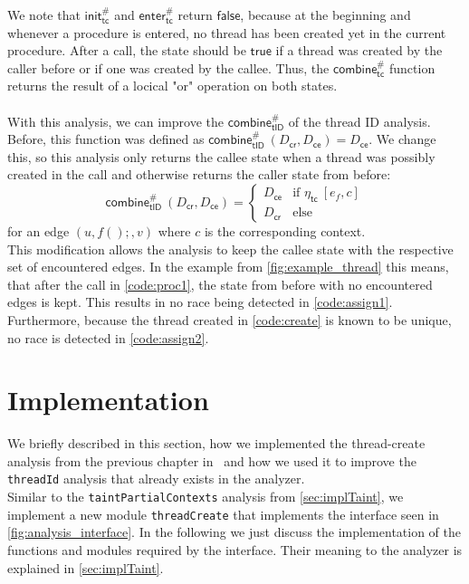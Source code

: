   We note that $\textsf{init}^{\#}_\textsf{tc}$ and $\textsf{enter}^{\#}_\textsf{tc}$ return $\textsf{false}$, because at the beginning and whenever a procedure is entered, no thread has been created yet in the current procedure. After a call, the state should be $\textsf{true}$ if a thread was created by the caller before or if one was created by the callee. Thus, the $\textsf{combine}^{\#}_\textsf{tc}$ function returns the result of a locical "or" operation on both states.\\
  \\
  With this analysis, we can improve the $\textsf{combine}^{\#}_\textsf{tID}$ of the thread ID analysis. Before, this function was defined as $\textsf{combine}^{\#}_\textsf{tID}\ (D_\textsf{cr}, D_\textsf{ce}) = D_\textsf{ce}$. We change this, so this analysis only returns the callee state when a thread was possibly created in the call and otherwise returns the caller state from before:
  \[\textsf{combine}^{\#}_\textsf{tID}\ (D_\textsf{cr}, D_\textsf{ce}) = \left\{ \begin{array}{ll}
    D_\textsf{ce} & \text{if } \eta_\textsf{tc}\ [e_f,c]\\
    D_\textsf{cr} & \text{else}
  \end{array} \right.\]
  for an edge $(u, f();, v)$ where $c$ is the corresponding context.\\
  This modification allows the analysis to keep the callee state with the respective set of encountered edges. In the example from \autoref{fig:example_thread} this means, that after the call in \autoref{code:proc1}, the state from before with no encountered edges is kept. This results in no race being detected in \autoref{code:assign1}. Furthermore, because the thread created in \autoref{code:create} is known to be unique, no race is detected in \autoref{code:assign2}.

  \section{Implementation}
    We briefly described in this section, how we implemented the thread-create analysis from the previous chapter in \gob\ and how we used it to improve the \texttt{threadId} analysis that already exists in the analyzer.\\
    Similar to the \texttt{taintPartialContexts} analysis from \autoref{sec:implTaint}, we implement a new module \texttt{threadCreate} that implements the interface seen in \autoref{fig:analysis_interface}. In the following we just discuss the implementation of the functions and modules required by the interface. Their meaning to the analyzer is explained in \autoref{sec:implTaint}.

